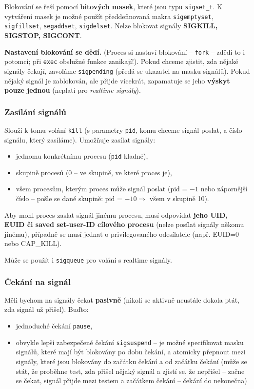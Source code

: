 \documentclass[a4paper, 11pt]{article}
\newcommand{\tcmd}[1]{\texttt{#1}}
\begin{document}
Blokování se řeší pomocí \textbf{bitových masek}, které jsou typu \tcmd{sigset\_t}. K vytváření masek je možné použít předdefinovaná makra \tcmd{sigemptyset}, \tcmd{sigfillset}, \tcmd{segaddset}, \tcmd{sigdelset}. Nelze blokovat signály \textbf{SIGKILL, SIGSTOP, SIGCONT}.
 
\textbf{Nastavení blokování se dědí.} (Proces si nastaví blokování -- \tcmd{fork} -- zdědí to i potomci; při \tcmd{exec} obslužné funkce zanikají!). Pokud chceme zjistit, zda nějaké signály čekají, zavoláme \tcmd{sigpending} (předá se ukazatel na masku signálů). Pokud nějaký signál je zablokován, ale přijde vícekrát, zapamatuje se jeho \textbf{výskyt pouze jednou} (neplatí pro \textit{realtime signály}).

\subsubsection{Zasílání signálů}
Slouží k tomu volání \tcmd{kill} (s parametry \tcmd{pid}, komu chceme signál poslat, a číslo signálu, který zasíláme). Umožňuje zasílat signály:
\begin{itemize}
    \item jednomu konkrétnímu procesu (\tcmd{pid} kladné),
    \item skupině procesů (0 -- ve skupině, ve které proces je),
    \item všem procesům, kterým proces může signál poslat (pid = $-1$ nebo zápornější číslo -- pošle se dané skupině: pid = $-10 \Rightarrow$ všem v skupině 10). \\
\end{itemize}
 
Aby mohl proces zaslat signál jinému procesu, musí odpovídat \textbf{jeho UID, EUID či saved set-user-ID cílového procesu} (nelze posílat signály někomu jinému), případně se musí jednat o privilegovaného odesílatele (např. EUID=0 nebo CAP\_KILL).
 
Může se použít i \tcmd{sigqueue} pro volání s realtime signály.
 
\subsubsection{Čekání na signál}
Měli bychom na signály čekat \textbf{pasivně} (nikoli se aktivně neustále dokola ptát, zda signál už přišel). Buďto:
\begin{itemize}
    \item jednoduché čekání \tcmd{pause},
    \item obvykle lepší zabezpečené čekání \tcmd{sigsuspend} -- je možné specifikovat masku signálů, které mají být blokovány po dobu čekání, a atomicky přepnout mezi signály, které jsou blokovány do začátku čekání a od začátku čekání (může se stát, že proběhne test, zda přišel nějaký signál a zjistí se, že nepřišel -- začne se čekat, signál přijde mezi testem a začátkem čekání -- čekání do nekonečna)
\end{itemize}
\end{document}
